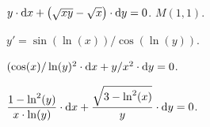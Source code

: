 \begin{problem}
	$y \cdot \mathop{}\!\mathrm{d} x + \left( \sqrt{x y} - \sqrt{x} \right) \cdot \mathop{}\!\mathrm{d} y = 0$.  $M(1,1)$.
\end{problem}

\begin{problem}
	$y' = \sin (\ln (x)) / \cos (\ln (y))$.
\end{problem}

\begin{problem}
	$(\cos (x) / \ln (y)^2 \cdot \mathop{}\!\mathrm{d} x + y / x^2 \cdot \mathop{}\!\mathrm{d} y = 0$.
\end{problem}

\begin{problem}
	$\dfrac{1 - \ln^2 (y)}{x \cdot \ln (y)} \cdot \mathop{}\!\mathrm{d} x + \dfrac{\sqrt{3 - \ln^2 (x)}}{y} \cdot \mathop{}\!\mathrm{d} y = 0$.
\end{problem}

